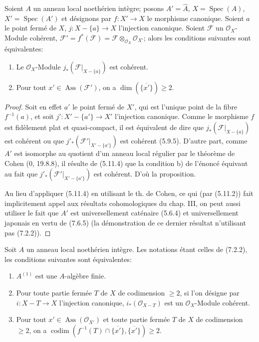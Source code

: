 \begin{proposition}[7.2.2]
\label{IV.2.s7.2.2-fr}
Soient $A$ un anneau local noethérien intègre; posons $A'=\widehat A$,
$X=\operatorname{Spec}(A)$, $X'=\operatorname{Spec}(A')$ et désignons par
$f:X'\to X$ le morphisme canonique. Soient $a$ le point fermé de $X$,
$j:X-\{a\}\to X$ l'injection canonique. Soient $\mathscr F$ un
$\mathscr O_X$-Module cohérent,
$\mathscr F'=f^*(\mathscr F)=\mathscr F\otimes_{\mathscr O_X}\mathscr O_{X'}$;
alors les conditions suivantes sont équivalentes:
\begin{enumerate}
\item[a)] Le $\mathscr O_X$-Module
$j_*(\mathscr F|_{X-\{a\}})$ est cohérent.
\item[b)] Pour tout $x'\in\operatorname{Ass}(\mathscr F')$, on a
$\dim(\overline{\{x'\}})\geqslant2$.
\end{enumerate}
\end{proposition}

\begin{proof}
Soit en effet $a'$ le point fermé de $X'$, qui est l'unique point de la
fibre $f^{-1}(a)$, et soit $j':X'-\{a'\}\to X'$ l'injection canonique.
Comme le morphisme $f$ est fidèlement plat et quasi-compact, il est
équivalent de dire que $j_*(\mathscr F|_{X-\{a\}})$ est cohérent ou que
$j'_*(\mathscr F'|_{X'-\{a'\}})$ est cohérent (5.9.5). D'autre part, comme
$A'$ est isomorphe au quotient d'un anneau local régulier par le théorème de
Cohen (0, 19.8.8), il résulte de (5.11.4) que la condition b) de l'énoncé
équivaut au fait que $j'_*(\mathscr F'|_{X'-\{a'\}})$ est cohérent. D'où la
proposition.

Au lieu d'appliquer (5.11.4) en utilisant le th. de Cohen, ce qui (par
(5.11.2)) fait implicitement appel aux résultats cohomologiques du chap.
III, on peut aussi utiliser le fait que $A'$ est universellement caténaire
(5.6.4) et universellement japonais en vertu de (7.6.5) (la démonstration de
ce dernier résultat n'utilisant pas (7.2.2)).
\end{proof}

\begin{proposition}[7.2.3]
\label{IV.2.s7.2.3-fr}
Soit $A$ un anneau local noethérien intègre. Les notations étant celles de
(7.2.2), les conditions suivantes sont équivalentes:
\begin{enumerate}
\item[a)] $A^{(1)}$ est une $A$-algèbre finie.
\item[b)] Pour toute partie fermée $T$ de $X$ de codimension $\geqslant2$,
si l'on désigne par $i:X-T\to X$ l'injection canonique,
$i_*(\mathscr O_{X-T})$ est un $\mathscr O_X$-Module cohérent.
\item[c)] Pour tout $x'\in\operatorname{Ass}(\mathscr O_{X'})$ et toute
partie fermée $T$ de $X$ de codimension $\geqslant2$, on a
$\operatorname{codim}(f^{-1}(T)\cap\overline{\{x'\}},
\overline{\{x'\}})\geqslant2$.
\end{enumerate}
\end{proposition}

